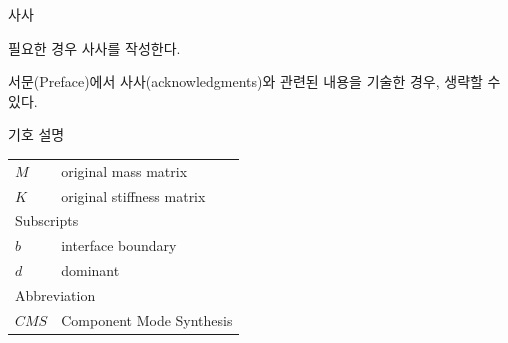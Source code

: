 \documentclass[11pt]{report}
\theoremstyle{plain}
\theoremstyle{definition}
\theoremstyle{corollary}
\theoremstyle{definition}
\theoremstyle{plain}
\theoremstyle{definition}
\theoremstyle{plain}
\begin{document}
%

\newpage
\begin{center}
\large
사사
\end{center}
\normalsize
필요한 경우 사사를 작성한다. 

서문(Preface)에서 사사(acknowledgments)와 관련된 내용을 기술한 경우, 생략할 수 있다.

\renewcommand{\contentsname}{목차}
\tableofcontents

\renewcommand{\listtablename}{표 목차}
\listoftables

\renewcommand{\listfigurename}{그림 목차}
\listoffigures

\newpage
\begin{center}
\large
기호 설명
\end{center}
\normalsize
\begin{tabular}{p{}p{}}
$M$	& original mass matrix\\
$K$	& original stiffness matrix\\[30pt]
\multicolumn{2}{l}{Subscripts}\\
$b$ & interface boundary\\
$d$ & dominant\\[30pt]
\multicolumn{2}{l}{Abbreviation}\\
$CMS$ & Component Mode Synthesis\\
\end{tabular}
\newpage 
\end{document}
